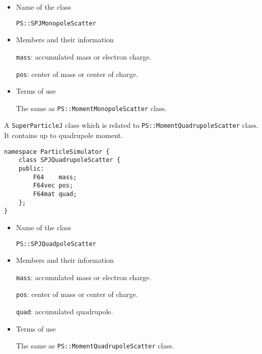 \begin{itemize}
  
\item Name of the class

  \texttt{PS::SPJMonopoleScatter}

\item Members and their information

  \texttt{mass}: accumulated mass or electron charge.

  \texttt{pos}: center of mass or center of charge.

\item Terms of use

  The same as \texttt{PS::MomentMonopoleScatter} class.

\end{itemize}  

\label{sec:SPJQuadrupoleScatter}

A \texttt{SuperParticleJ} class which is related to \texttt{PS::MomentQuadrupoleScatter} class. It contains up to quadrupole moment.

\begin{screen}
\begin{verbatim}
namespace ParticleSimulator {
    class SPJQuadrupoleScatter {
    public:
        F64    mass;
        F64vec pos;
        F64mat quad;
    };
}
\end{verbatim}
\end{screen}

\begin{itemize}
  
\item Name of the class

  \texttt{PS::SPJQuadpoleScatter}

\item Members and their information

  \texttt{mass}: accumulated mass or electron charge.

  \texttt{pos}: center of mass or center of charge.

  \texttt{quad}: accumulated quadrupole.

\item Terms of use

  The same as \texttt{PS::MomentQuadrupoleScatter} class.

\end{itemize}  


